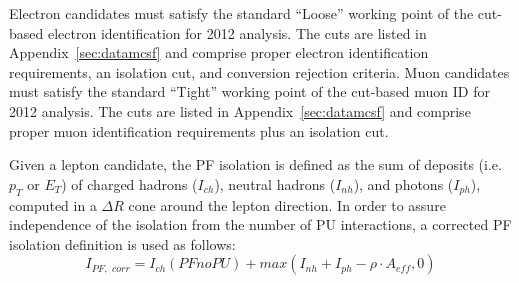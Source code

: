 Electron candidates must satisfy the standard ``Loose'' working point of the cut-based electron identification for 2012 analysis. The cuts are listed in Appendix~\ref{sec:datamcsf} and comprise proper electron identification requirements, an isolation cut, and conversion rejection criteria. Muon candidates must satisfy the standard ``Tight'' working point of the cut-based muon ID for 2012 analysis. The cuts are listed in Appendix~\ref{sec:datamcsf} and comprise proper muon identification requirements plus an isolation cut.

Given a lepton candidate, the PF isolation is defined as the sum of deposits (i.e. $p_T$ or $E_T$) of charged hadrons ($I_{ch}$), neutral hadrons ($I_{nh}$), and photons ($I_{ph}$), computed in a $\Delta R$ cone around the lepton direction. In order to assure independence of the isolation from the number of PU interactions, a corrected PF isolation definition is used as follows: 
\begin{equation} I_{PF, \,\, corr} = I_{ch}(PFnoPU) + max(I_{nh}+I_{ph}- \rho \cdot A_{eff} , 0) \end{equation}

